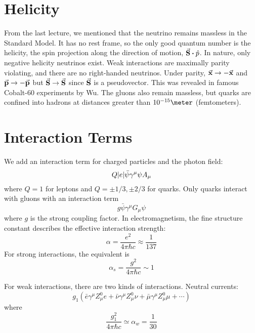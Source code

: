 \documentclass[a4paper,twoside,master.tex]{subfiles}
\begin{document}

\section{Helicity}\label{sec:helicity}


From the last lecture, we mentioned that the neutrino remains massless in the Standard Model. It has no rest frame, so the only good quantum number is the helicity, the spin projection along the direction of motion, $ \va{S} \vdot \hat{p} $. In nature, only negative helicity neutrinos exist. Weak interactions are maximally parity violating, and there are no right-handed neutrinos. Under parity, $ \va{x} \to - \va{x} $ and $ \va{p} \to - \va{p} $ but $ \va{S} \to \va{S} $ since $ \va{S} $ is a pseudovector. This was revealed in famous Cobalt-60 experiments by Wu. The gluons also remain massless, but quarks are confined into hadrons at distances greater than $ 10^{-15} \meter $ (femtometers).

\section{Interaction Terms}\label{sec:interaction_terms}


We add an interaction term for charged particles and the photon field:
\begin{equation}
    Q \abs{e} \bar{\psi} \gamma^{\mu} \psi A_{\mu}
\end{equation}
where $ Q = 1 $ for leptons and $ Q = \pm 1/3,\pm 2/3 $ for quarks. Only quarks interact with gluons with an interaction term
\begin{equation}
    g \bar{\psi} \gamma^{\mu} G_{\mu} \psi
\end{equation}
where $ g $ is the strong coupling factor. In electromagnetism, the fine structure constant describes the effective interaction strength:
\begin{equation}
    \alpha = \frac{e^2}{4 \pi \hbar c} \approx \frac{1}{137}
\end{equation}
For strong interactions, the equivalent is
\begin{equation}
    \alpha_s = \frac{g^2}{4 \pi \hbar c} \sim 1
\end{equation}

For weak interactions, there are two kinds of interactions. Neutral currents:
\begin{equation}
    g_1 \left( \bar{e} \gamma^{\mu} Z_{\mu}^0 e + \bar{\nu} \gamma^{\mu} Z_{\mu}^0 \nu + \bar{\mu} \gamma^{\mu} Z_{\mu}^0 \mu + \cdots \right)
\end{equation}
where
\begin{equation}
    \frac{g_1^2}{4 \pi \hbar c} \simeq \alpha_{w} = \frac{1}{30}
\end{equation}
\end{document}
